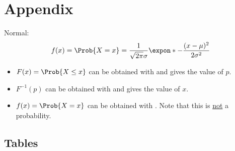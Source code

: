 \chapter{Appendix}
Normal:
\[ f(x)=\Prob{X=x}=\frac{1}{\sqrt{2\pi}\sigma}
      \expon*{-\frac{(x-\mu)^2}{2\sigma^2}}  \]
\begin{itemize}
      \item $ F(x)=\Prob{X\le x} $ can be obtained with
             and gives
            the value of $ p $.
      \item $ F^{-1}(p) $ can be obtained with
             and gives
            the value of $ x $.
      \item $ f(x)=\Prob{X=x} $ can be obtained with
            . Note that this is
            \underline{not} a probability.
\end{itemize}
\newpage
\section{Tables}
